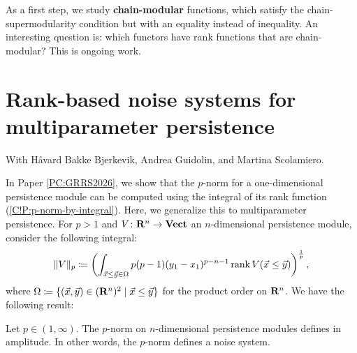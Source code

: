 As a first step, we study \textbf{chain-modular} functions, which satisfy the chain-supermodularity condition but with an equality instead of inequality. An interesting question is: which functors have rank functions that are chain-modular? This is ongoing work.

\section{Rank-based noise systems for multiparameter persistence}

With Håvard Bakke Bjerkevik, Andrea Guidolin, and Martina Scolamiero.

In Paper \ref{PC:GRRS2026}, we show that the $p$-norm for a one-dimensional persistence module can be computed using the integral of its rank function (\cref{C!P:p-norm-by-integral}). Here, we generalize this to multiparameter persistence. For $p > 1$ and $V \colon \mathbf{R}^n \to \operatorname{\mathbf{Vect}}$ an $n$-dimensional persistence module, consider the following integral:
\[
  \| V \|_{p} \coloneq \left( \int_{\vec{x} \leq \vec{y} \in \Omega} p (p - 1)(y_1 - x_1)^{p - n - 1} \operatorname{rank} V(\vec{x} \leq \vec{y}) \right)^{\frac{1}{p}},
\]
where $\Omega \coloneq \{(\vec{x}, \vec{y}) \in (\mathbf{R}^n)^2 \mid \vec{x} \leq \vec{y}\}$ for the product order on $\mathbf{R}^n$. We have the following result:

\begin{proposition}
  Let $p \in (1, \infty)$. The $p$-norm on $n$-dimensional persistence modules defines in amplitude. In other words, the $p$-norm defines a noise system.
\end{proposition}

